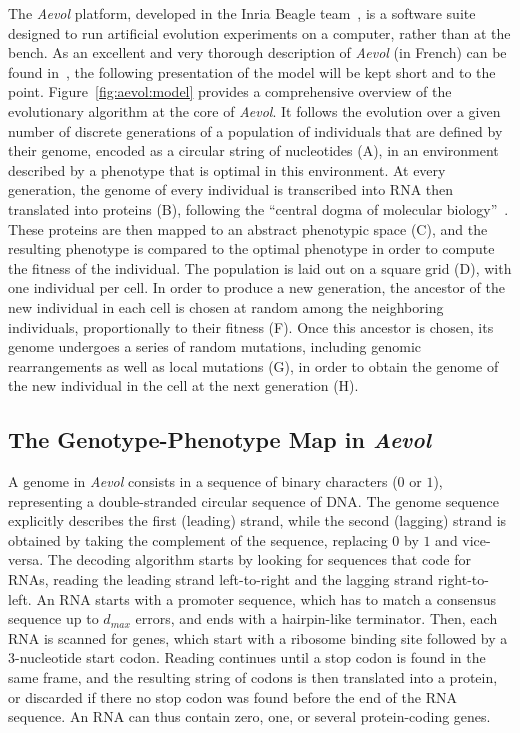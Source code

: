 The \emph{Aevol} platform, developed in the Inria Beagle team~\citep{rutten2019}, is a software suite designed to run artificial evolution experiments on a computer, rather than at the bench.
As an excellent and very thorough description of \emph{Aevol} (in French) can be found in~\cite{liard2020b}, the following presentation of the model will be kept short and to the point.
Figure~\ref{fig:aevol:model} provides a comprehensive overview of the evolutionary algorithm at the core of \emph{Aevol}.
It follows the evolution over a given number of discrete generations of a population of individuals that are defined by their genome, encoded as a circular string of nucleotides (A), in an environment described by a phenotype that is optimal in this environment.
At every generation, the genome of every individual is transcribed into RNA then translated into proteins (B), following the ``central dogma of molecular biology''~\citep{crick1958}.
These proteins are then mapped to an abstract phenotypic space (C), and the resulting phenotype is compared to the optimal phenotype in order to compute the fitness of the individual.
The population is laid out on a square grid (D), with one individual per cell.
In order to produce a new generation, the ancestor of the new individual in each cell is chosen at random among the neighboring individuals, proportionally to their fitness (F).
Once this ancestor is chosen, its genome undergoes a series of random mutations, including genomic rearrangements as well as local mutations (G), in order to obtain the genome of the new individual in the cell at the next generation (H).

\subsection{The Genotype-Phenotype Map in \emph{Aevol}}

A genome in \emph{Aevol} consists in a sequence of binary characters ($0$ or $1$), representing a double-stranded circular sequence of DNA.
The genome sequence explicitly describes the first (leading) strand, while the second (lagging) strand is obtained by taking the complement of the sequence, replacing $0$ by $1$ and vice-versa.
The decoding algorithm starts by looking for sequences that code for RNAs, reading the leading strand left-to-right and the lagging strand right-to-left.
An RNA starts with a promoter sequence, which has to match a consensus sequence up to $d_{max}$ errors, and ends with a hairpin-like terminator.
Then, each RNA is scanned for genes, which start with a ribosome binding site followed by a 3-nucleotide start codon.
Reading continues until a stop codon is found in the same frame, and the resulting string of codons is then translated into a protein, or discarded if there no stop codon was found before the end of the RNA sequence.
An RNA can thus contain zero, one, or several protein-coding genes.

